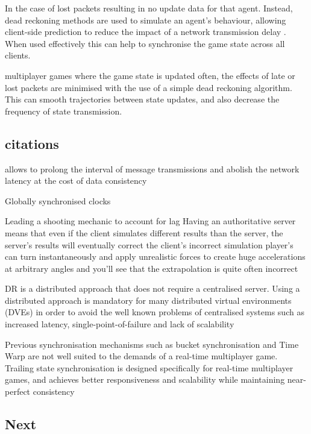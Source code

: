 \documentclass[journal]{IEEEtran}
\begin{document}
In the case of lost packets resulting in no update data for that agent. Instead, dead reckoning methods are used to simulate an agent's behaviour, allowing client-side prediction to reduce the impact of a network transmission delay \cite{pantel2002suitability}. When used effectively this can help to synchronise the game state across all clients.

multiplayer games where the game state is updated often, the effects of late or lost packets are minimised with the use of a simple dead reckoning algorithm. This can smooth trajectories between state updates, and also decrease the frequency of state transmission.

\subsection{citations}

allows to prolong the interval of message transmissions and abolish the network latency at the cost of data consistency \cite{smed2002aspects}



Globally synchronised clocks \cite{aggarwal2004accuracy}

Leading a shooting mechanic to account for lag \cite{bernier2001latency}
Having an authoritative server means that even if the client simulates different results than the server, the server’s results will eventually correct the client’s incorrect simulation \cite{bernier2001latency}
player’s can turn instantaneously and apply unrealistic forces to create huge accelerations at arbitrary angles and you’ll see that the extrapolation is quite often incorrect \cite{bernier2001latency}

DR is a distributed approach that does not require a centralised server. Using a distributed approach is mandatory for many distributed virtual environments (DVEs) in order to avoid the well known problems of centralised systems such as increased latency, single-point-of-failure and lack of scalability \cite{mauve2000keep}

Previous synchronisation mechanisms such as bucket synchronisation and Time Warp are not well suited to the demands of a real-time multiplayer game. Trailing state synchronisation is designed specifically for real-time multiplayer games, and achieves better responsiveness and scalability while maintaining near-perfect consistency \cite{cronin2001distributed}


\subsection{Next}
\end{document}
